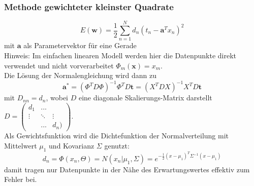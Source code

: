 	\subsubsection{Methode gewichteter kleinster Quadrate}
	\begin{equation*}
		E(\pmb{w})=\frac{1}{2}\sum_{n=1}^Nd_n(t_n-\pmb{a}^Tx_n)^2
	\end{equation*}
	mit $\pmb{a}$ als Parametervektor für eine Gerade\\[5pt]
	Hinweis: Im einfachen linearen Modell werden hier die Datenpunkte direkt verwendet und nicht vorverarbeitet $\Phi_m(\pmb{x})=x_m$.\\
	Die Lösung der Normalengleichung wird dann zu
	\begin{equation*}
		\pmb{a^*} = (\Phi^TD\Phi)^{-1}\Phi^TD\pmb{t} = (X^TDX)^{-1}X^TD\pmb{t}
	\end{equation*}
	mit $D_{nn} = d_n$, wobei $D$ eine diagonale Skalierungs-Matrix darstellt $D=\begin{pmatrix}
			d_1 & ... &  \\
	\vdots & \ddots & \vdots \\
	 & ... & d_n)
	\end{pmatrix}$.\\
	Als Gewichtsfunktion wird die Dichtefunktion der Normalverteilung mit Mittelwert $\mu_1$ und Kovarianz $\Sigma$ genutzt:
	\begin{equation*}
		d_n=\Phi(x_n, \Theta) = N(x_n\vert\mu_1,\Sigma) = e^{-\frac{1}{2}(x-\mu_1)^T\Sigma^{-1}(x-\mu_1)}
	\end{equation*}
	damit tragen nur Datenpunkte in der Nähe des Erwartungswertes effektiv zum Fehler bei.
